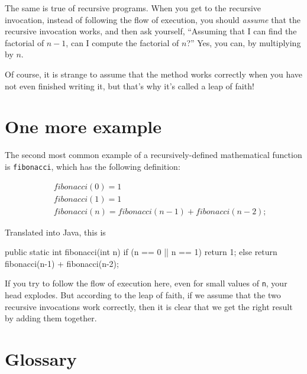 The same is true of recursive programs.  When you get to
the recursive invocation, instead of following the flow of
execution, you should {\em assume} that the recursive invocation
works, and then ask yourself,
``Assuming that I can find the factorial of $n-1$, can I
compute the factorial of $n$?''  Yes, you can, by multiplying by $n$.

Of course, it is strange to assume that the method
works correctly when you have not even finished writing it,
but that's why it's called a leap of faith!


\section{One more example}
\label{fibonacci}

The second most common example of a recursively-defined
mathematical function is {\tt fibonacci}, which has the
following definition:

\begin{eqnarray*}
&& fibonacci(0) = 1 \\
&& fibonacci(1) = 1 \\
&& fibonacci(n) = fibonacci(n-1) + fibonacci(n-2);
\end{eqnarray*}

Translated into Java, this is

\begin{code}
  public static int fibonacci(int n) {
    if (n == 0 || n == 1) {
      return 1;
    } else {
      return fibonacci(n-1) + fibonacci(n-2);
    }
  }
\end{code}

If you try to follow the flow of execution here, even for small
values of {\tt n}, your head explodes.  But according to the leap of
faith, if we assume that the two recursive invocations work correctly, then
it is clear that we get the right result by adding them together.


\section{Glossary}

